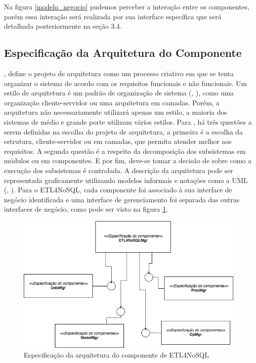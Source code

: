 Na figura \ref{modelo_negocio} pudemos perceber a interação entre os componentes, porém essa interação será realizada por sua interface específica que será detalhada posteriormente na seção 3.4.

\subsection{Especificação da Arquitetura do Componente}

\cite{sommerville:2013}, define o projeto de arquitetura como um processo criativo em que se tenta organizar o sistema de acordo com os requisitos funcionais e não funcionais. Um estilo de arquitetura é um padrão de organização de sistema (\cite{shaw:1996}, \cite{sommerville:2013}), como uma organização cliente-servidor ou uma arquitetura em camadas. Porém, a arquitetura não necessariamente utilizará apenas um estilo, a maioria dos sistemas de médio e grande porte utilizam vários estilos. Para \cite{shaw:1996}, há três questões a serem definidas na escolha do projeto de arquitetura, a primeira é a escolha da estrutura, cliente-servidor ou em camadas, que permita atender melhor aos requisitos. A segunda questão é a respeito da decomposição dos subsistemas em módulos ou em componentes. E por fim, deve-se tomar a decisão de sobre como a execução dos subsistemas é controlada. A descrição da arquitetura pode ser representada graficamente utilizando modelos informais e notações como a UML (\cite{clements:2002}, \cite{sommerville:2013}). Para o ETL4NoSQL, cada componente foi associado à sua interface de negócio identificada e uma interface de gerenciamento foi separada das outras interfaces de negócio, como pode ser visto na figura \ref{arquitetura}.

\begin{figure}[h]
	\centering
	\includegraphics[scale=0.5]{fig/arquitetura_comp.png}
	\caption{Especificação da arquitetura do componente de ETL4NoSQL}
	\label{arquitetura}
\end{figure}

